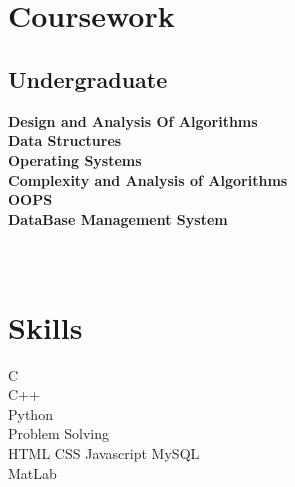 \documentclass[]{deedy-resume-openfont}
\begin{document}
\begin{minipage}[t]{0.33\textwidth}
\section{\\ Coursework}
\subsection{Undergraduate \\}
\bf Design and Analysis Of Algorithms \\
Data Structures \\
Operating Systems \\
Complexity and Analysis of Algorithms \\
OOPS \\
DataBase Management System \\


\section{\\ Skills}
C \\ C++ \\  Python \\ Problem Solving \\
\vspace{\topsep}
\textbullet{} HTML \textbullet{} CSS \textbullet{} Javascript
\textbullet{} MySQL \\ \textbullet{} MatLab

%
%

\end{minipage} 
\hfill
\end{document}
